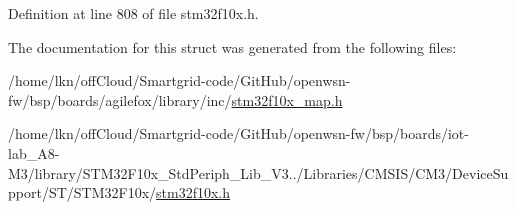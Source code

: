 Definition at line 808 of file stm32f10x.\+h.



The documentation for this struct was generated from the following files\+:\begin{DoxyCompactItemize}
\item 
/home/lkn/off\+Cloud/\+Smartgrid-\/code/\+Git\+Hub/openwsn-\/fw/bsp/boards/agilefox/library/inc/\hyperlink{agilefox_2library_2inc_2stm32f10x__map_8h}{stm32f10x\+\_\+map.\+h}\item 
/home/lkn/off\+Cloud/\+Smartgrid-\/code/\+Git\+Hub/openwsn-\/fw/bsp/boards/iot-\/lab\+\_\+\+A8-\/\+M3/library/\+S\+T\+M32\+F10x\+\_\+\+Std\+Periph\+\_\+\+Lib\+\_\+\+V3../\+Libraries/\+C\+M\+S\+I\+S/\+C\+M3/\+Device\+Support/\+S\+T/\+S\+T\+M32\+F10x/\hyperlink{iot-lab___a8-_m3_2library_2_s_t_m32_f10x___std_periph___lib___v3_85_80_2_libraries_2_c_m_s_i_s_26497265545392eb5694b064ae15018db}{stm32f10x.\+h}\end{DoxyCompactItemize}
